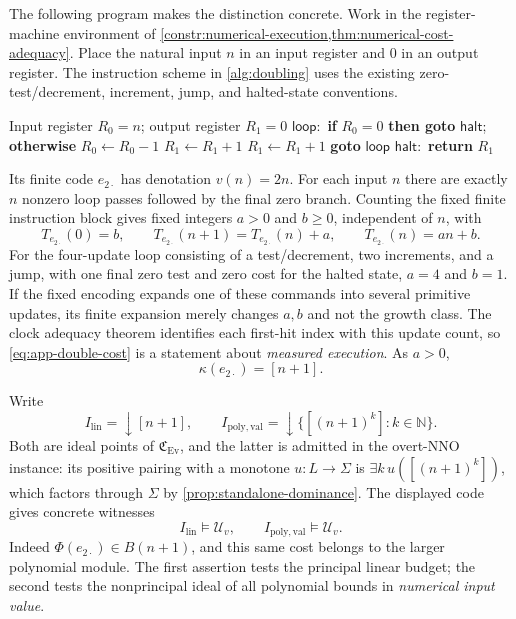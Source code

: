 \documentclass[11pt,a4paper]{article}
\numberwithin{algorithm}{section}
\numberwithin{equation}{section}
\theoremstyle{definition}
\theoremstyle{remark}
\theoremstyle{plain}
\newcommand{\N}{\mathbb N}
\newcommand{\Ev}{{\operatorname{Ev}}}
\newcommand{\Cplx}{\mathfrak C_{\Ev}}
\theoremstyle{definition}
\theoremstyle{plain}
\begin{document}
The following program makes the distinction concrete. Work in the
register-machine environment of
\cref{constr:numerical-execution,thm:numerical-cost-adequacy}.
Place the natural input $n$ in an input register and $0$ in an
output register. The instruction scheme in \cref{alg:doubling} uses the existing
zero-test/decrement, increment, jump, and halted-state conventions.
\begin{algorithm}[H]
\caption{The doubling register program}\label{alg:doubling}
\small
\begin{algorithmic}[1]
\Require Input register $R_0=n$; output register $R_1=0$
\State $\mathsf{loop}:$ \textbf{if} $R_0=0$ \textbf{then goto} $\mathsf{halt}$;
\Statex \hspace{\algorithmicindent}\textbf{otherwise} $R_0\gets R_0-1$
\State $R_1\gets R_1+1$
\State $R_1\gets R_1+1$
\State \textbf{goto} $\mathsf{loop}$
\State $\mathsf{halt}:$ \textbf{return} $R_1$
\end{algorithmic}
\end{algorithm}
Its finite code $e_{2\cdot}$ has denotation
$v(n)=2n$.  For each input $n$ there are exactly $n$ nonzero loop
passes followed by the final zero branch.  Counting the fixed finite
instruction block gives fixed integers $a>0$ and $b\ge0$, independent
of $n$, with
\begin{equation}\label{eq:app-double-cost}
 T_{e_{2\cdot}}(0)=b,\qquad
 T_{e_{2\cdot}}(n+1)=T_{e_{2\cdot}}(n)+a,
 \qquad T_{e_{2\cdot}}(n)=an+b.
\end{equation}
For the four-update loop consisting of a test/decrement,
two increments, and a jump, with one final zero test and zero cost for
the halted state, $a=4$ and $b=1$.  If the fixed encoding expands one
of these commands into several primitive updates, its finite expansion
merely changes $a,b$ and not the growth class.
The clock adequacy theorem identifies each first-hit index with this
update count, so \eqref{eq:app-double-cost} is a statement about
\emph{measured execution}.
As $a>0$,
\[
 \kappa(e_{2\cdot})=[n+1].
\]

Write
\[
 I_{\mathrm{lin}}=\downarrow[n+1],\qquad
 I_{\mathrm{poly,val}}
   =\downarrow\{[(n+1)^k]:k\in\N\}.
\]
Both are ideal points of $\Cplx$, and the latter is admitted
in the overt-NNO instance: its positive pairing with a monotone
$u:L\to\Sigma$ is $\exists k\,u([(n+1)^k])$, which factors through
$\Sigma$ by \cref{prop:standalone-dominance}.  The displayed code
gives concrete witnesses
\begin{equation}\label{eq:app-double-probes}
 I_{\mathrm{lin}}\models\mathcal U_v,
 \qquad I_{\mathrm{poly,val}}\models\mathcal U_v.
\end{equation}
Indeed $\Phi(e_{2\cdot})\in B(n+1)$, and this same cost belongs to
the larger polynomial module.  The first assertion tests the
principal linear budget; the second tests the nonprincipal ideal of
all polynomial bounds in \emph{numerical input value}.
\end{document}
